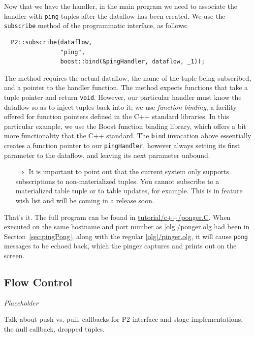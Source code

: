 \documentclass{article}
\begin{document}
Now that we have the handler, in the main program we need to associate
the handler with \lstinline$ping$ tuples after the dataflow has been
created. We use the \texttt{subscribe} 
method of the programmatic interface, as follows:
\begin{verbatim}
  P2::subscribe(dataflow,
                "ping",
                boost::bind(&pingHandler, dataflow, _1));
\end{verbatim}
The method requires the actual dataflow, the name of the tuple being
subscribed, and a pointer to the handler function.  The method expects
functions that take a tuple pointer and return \texttt{void}. However,
our particular handler must know the dataflow so as to inject tuples
back into it; we use \emph{function binding}, a facility offered for
function pointers defined in the C++ standard libraries. In this
particular example, we use the Boost function binding library, which
offers a bit more functionality that the C++ standard.  The
\texttt{bind} invocation above essentially creates a function pointer to
our \texttt{pingHandler}, however always setting its first parameter to
the dataflow, and leaving its next parameter unbound.

\begin{itemize}
\item[$\Longrightarrow$] It is important to point out that the current
  system only supports subscriptions to non-materialized tuples. You
  cannot subscribe to a materialized table tuple or to table updates,
  for example.  This is in feature wish list and will be coming in a
  release soon.
\end{itemize}


That's it. The full program can be found in
\url{tutorial/c++/ponger.C}. When executed on the same hostname and port
number as \url{[olg]/ponger.olg} had been in
Section~\ref{sec:pingPong}, along with the regular
\url{[olg]/pinger.olg}, it will cause \lstinline$pong$ messages
to be echoed back, which the pinger captures and prints out on the
screen.




\subsection{Flow Control}

\emph{Placeholder}

Talk about push vs. pull, callbacks for P2 interface and stage
implementations, the null callback, dropped tuples.
\end{document}
